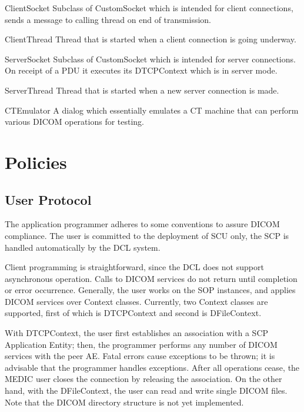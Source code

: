 \documentclass[a4paper,10pt]{article}
\begin{document}
\begin{class}{ClientSocket}
  Subclass of CustomSocket which is intended for client
  connections, sends a message to calling thread on end of transmission.
\end{class}

\begin{class}{ClientThread}
  Thread that is started when a client connection is going
  underway.
\end{class}

\begin{class}{ServerSocket}
  Subclass of CustomSocket which is intended for server
  connections. On receipt of a PDU it executes its DTCPContext which is in
  server mode.
\end{class}

\begin{class}{ServerThread}
  Thread that is started when a new server connection is made.
\end{class}

\begin{class}{CTEmulator}
  A dialog which essentially emulates a CT machine that can perform
  various DICOM operations for testing.
\end{class}

\section{Policies}

\subsection{User Protocol}

The application programmer adheres to some conventions to assure DICOM
compliance. The user is committed to the deployment of SCU only, the SCP is
handled automatically by the DCL system.

Client programming is straightforward, since the DCL does not support
asynchronous operation. Calls to DICOM services do not return until
completion or error occurrence. Generally, the user works on the SOP
instances, and applies DICOM services over Context classes. Currently, two
Context classes are supported, first of which is DTCPContext and second is
DFileContext.

With DTCPContext, the user first establishes an association with a SCP
Application Entity; then, the programmer performs any number of DICOM
services with the peer AE\@. Fatal errors cause exceptions to be thrown; it is
advisable that the programmer handles exceptions. After all operations
cease, the MEDIC user closes the connection by releasing the association. On
the other hand, with the DFileContext, the user can read and write single
DICOM files. Note that the DICOM directory structure is not yet implemented.
\end{document}
